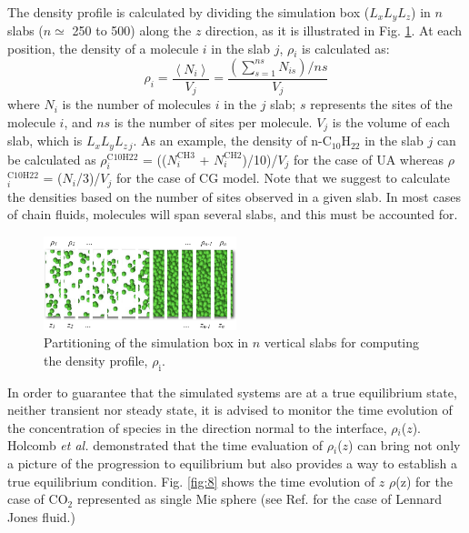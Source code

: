 \documentclass[9pt,bestpractices]{livecoms}
\begin{document}
The density profile is calculated by dividing the simulation box
($L_{x}L_{y}L_{z}$) in $n$ slabs
($n{\simeq}$ 250 to 500) along the $z$ direction, as it is
illustrated in Fig. \ref{fig:7}. At each position, the density of a molecule
$i$ in the slab $j$, {${\rho}$}$_{i}$  is calculated as:
\begin{equation}
\rho_{i}=\frac{\left\langle N_{i}\right\rangle }{V_{j}}=\frac{\left(\sum_{s=1}^{ns}N_{is}\right)/ns}{V_{j}}
\end{equation}
where $N_{i}$ is the number of molecules $i$ in the $j$
slab; $s$ represents the sites of the molecule $i$, and
$ns$ is the number of sites per molecule. $V_{j}$ is the volume of each
slab, which is $L_{x}L_{y}L_{z\,j}$. As an
example, the density of n-C$_{10}$H$_{22}$ in the slab $j$ can be
calculated as {${\rho}$}$_{i}^{\mathrm{C10H22}}$
= (($N_{i}^{\mathrm{CH3}}$
+ $N_{i}^{\mathrm{CH2}}$)/10)/$V_{j}$ for the case of UA
whereas {${\rho}$}$_{i}^{\mathrm{C10H22}}$
= ($N_{i}$/3)/$V_{j}$ for the case of CG model.
Note that we suggest to calculate the densities based on the number of sites observed
in a given slab. In most cases of chain fluids, molecules will span several slabs,
and this must be accounted for.

\begin{figure}
\includegraphics[width=0.5\textwidth]{gfx/image51.png}
\caption{Partitioning of the simulation box in $n$ vertical slabs for computing the density profile, ${\rho}_{\mathrm{i}}$.}
\label{fig:7}
\end{figure}

In order to guarantee that the simulated systems are at a true equilibrium
state, neither transient nor steady state, it is advised to monitor the time
evolution of the concentration of species in the direction normal to the
interface, {${\rho}$}$_{i}$($z$). Holcomb \textit{et al.} \citep{holcomb1993} demonstrated that the time evaluation of
{${\rho}$}$_{i}$($z$) can bring not only a picture of the progression to
equilibrium but also provides a way to establish a true equilibrium condition.
Fig. \ref{fig:8} shows the time evolution of $z$ \textendash{} {${\rho}$}(z)
for the case of CO$_{2}$ represented as single Mie sphere (see Ref. \citep{mejia2005} for the case of
Lennard \textendash{} Jones fluid.) 
\end{document}
